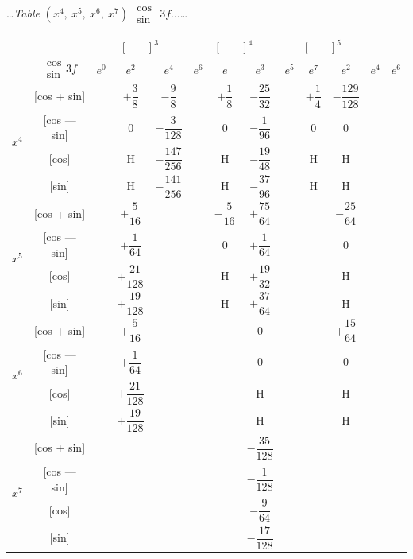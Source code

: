 \documentclass[10pt,a4paper]{article}
\newcommand{\tabletitle}[2]{%
  \begin{center}
  \ldots\textit{Table} #1 $\displaystyle\begin{smallmatrix} \cos \\ \sin \end{smallmatrix}$ #2\ldots
  \end{center}
}
\begin{document}
\vspace{1em}

\tabletitle{$(x^4,\ x^5,\ x^6,\ x^7)$}{$3f\ldots$}

\begin{center}
\small
\begin{tabular}{|c|c|c|c|c|c|c|c|c|c|c|c|}
\hline
& &  &  &  \\
& $\begin{smallmatrix} \cos \\ \sin \end{smallmatrix} 3f$ & $e^0$ & $e^2$ & $e^4$ & $e^6$ & $e$ & $e^3$ & $e^5$ & $e^7$ & $e^2$ & $e^4$ & $e^6$ \\
\hline
{} & [cos + sin] & & $+\dfrac{3}{8}$ & $-\dfrac{9}{8}$ & & $+\dfrac{1}{8}$ & $-\dfrac{25}{32}$ & & $+\dfrac{1}{4}$ & $-\dfrac{129}{128}$ \\
& [cos --- sin] & & $0$ & $-\dfrac{3}{128}$ & & $0$ & $-\dfrac{1}{96}$ & & $0$ & $0$ \\
& [cos] & & H & $-\dfrac{147}{256}$ & & H & $-\dfrac{19}{48}$ & & H & H \\
& [sin] & & H & $-\dfrac{141}{256}$ & & H & $-\dfrac{37}{96}$ & & H & H \\
\hline
{} & [cos + sin] & & $+\dfrac{5}{16}$ & & & $-\dfrac{5}{16}$ & $+\dfrac{75}{64}$ & & & $-\dfrac{25}{64}$ \\
& [cos --- sin] & & $+\dfrac{1}{64}$ & & & $0$ & $+\dfrac{1}{64}$ & & & $0$ \\
& [cos] & & $+\dfrac{21}{128}$ & & & H & $+\dfrac{19}{32}$ & & & H \\
& [sin] & & $+\dfrac{19}{128}$ & & & H & $+\dfrac{37}{64}$ & & & H \\
\hline
{} & [cos + sin] & & $+\dfrac{5}{16}$ & & & & $0$ & & & $+\dfrac{15}{64}$ \\
& [cos --- sin] & & $+\dfrac{1}{64}$ & & & & $0$ & & & $0$ \\
& [cos] & & $+\dfrac{21}{128}$ & & & & H & & & H \\
& [sin] & & $+\dfrac{19}{128}$ & & & & H & & & H \\
\hline
{} & [cos + sin] & & & & & & $-\dfrac{35}{128}$ & & \\
& [cos --- sin] & & & & & & $-\dfrac{1}{128}$ & & \\
& [cos] & & & & & & $-\dfrac{9}{64}$ & & \\
& [sin] & & & & & & $-\dfrac{17}{128}$ & & \\
\hline
\end{tabular}
\end{center}
\end{document}
